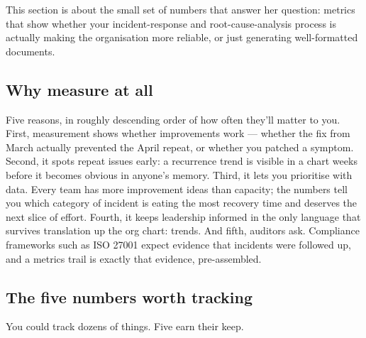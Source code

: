 This section is about the small set of numbers that answer her question: metrics that show whether your incident-response and root-cause-analysis process is actually making the organisation more reliable, or just generating well-formatted documents.



\subsection{Why measure at all}


Five reasons, in roughly descending order of how often they'll matter to you. First, measurement shows whether improvements work — whether the fix from March actually prevented the April repeat, or whether you patched a symptom. Second, it spots repeat issues early: a recurrence trend is visible in a chart weeks before it becomes obvious in anyone's memory. Third, it lets you prioritise with data. Every team has more improvement ideas than capacity; the numbers tell you which category of incident is eating the most recovery time and deserves the next slice of effort. Fourth, it keeps leadership informed in the only language that survives translation up the org chart: trends. And fifth, auditors ask. Compliance frameworks such as ISO 27001 expect evidence that incidents were followed up, and a metrics trail is exactly that evidence, pre-assembled.



\subsection{The five numbers worth tracking}


You could track dozens of things. Five earn their keep.


